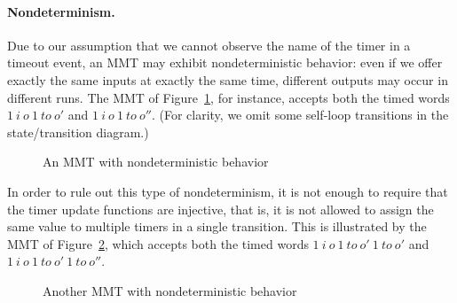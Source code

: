 \paragraph{Nondeterminism.}
Due to our assumption that we cannot observe the name of the timer in a timeout event, an MMT may exhibit nondeterministic
behavior: even if we offer exactly the same inputs at exactly the same time, different outputs may occur in different runs. 
The MMT of Figure~\ref{fig:nondeterminism}, for instance, accepts both the timed words
$1 ~ i ~ o ~ 1 ~ \mathit{to} ~ o'$ and $1 ~ i ~ o ~ 1 ~ \mathit{to} ~ o''$.
(For clarity, we omit some self-loop transitions in the state/transition diagram.)
\begin{figure}[ht]
\begin{center}
\caption{An MMT with nondeterministic behavior}
\label{fig:nondeterminism}
\end{center}
\end{figure}
\iflong
In order to rule out this type of nondeterminism, it is not enough to require that the timer update functions are injective,
that is, it is not allowed to assign the same value to multiple timers in a single transition.
This is illustrated by the MMT of Figure~\ref{fig:nondeterminism2}, which accepts both the timed words
$1 ~ i ~ o ~ 1 ~ \mathit{to} ~ o'~ 1 ~ \mathit{to} ~ o'$ and $1 ~ i ~ o ~ 1 ~ \mathit{to} ~ o' ~ 1 ~ \mathit{to} ~ o''$.
\begin{figure}[ht]
\begin{center}
\caption{Another MMT with nondeterministic behavior}
\label{fig:nondeterminism2}
\end{center}
\end{figure}
